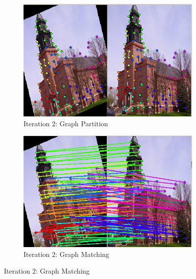 \documentclass[
	fontsize=12pt,
	paper=a4,
	twoside=false,
	numbers=noenddot,
	plainheadsepline,
	toc=listof,
	toc=bibliography
]{scrartcl}
\begin{document}
\begin{figure}[ht]
	\ContinuedFloat
	\begin{subfigure}[b]{0.5\textwidth}
		\centering
		\includegraphics[scale=0.35]{fig/method2/test_imagetrafo2/partition_it2.jpg} 
		\caption{Iteration $2$: Graph Partition} 
	\end{subfigure}%
	\begin{subfigure}[b]{0.5\textwidth}
		\centering
		\includegraphics[scale=0.35]{fig/method2/test_imagetrafo2/LL_it2.jpg} 
		\caption{Iteration $2$: Graph Matching} 
	\end{subfigure} 
	

\end{figure}
\end{document}
